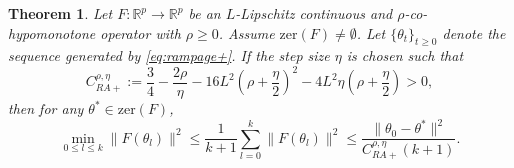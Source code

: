 \documentclass[10pt,a4paper]{amsart}
\newtheorem{theorem}{Theorem}
\begin{document}
\begin{theorem} \label{thm:es_ramp_general}
Let $F: \mathbb{R}^p \to \mathbb{R}^p$ be an $L$-Lipschitz continuous and $\rho$-co-hypomonotone operator with $\rho \ge 0$. Assume $\mathrm{zer}(F) \neq \emptyset$. Let $\{\theta_t\}_{t \ge 0}$ denote the sequence generated by \eqref{eq:rampage+}. If the step size $\eta$ is chosen such that
\begin{equation}
C_{RA+}^{\rho,\eta} := \frac{3}{4} - \frac{2\rho}{\eta} - 16L^2 \left(\rho + \frac{\eta}{2}\right)^2 - 4L^2\eta \left(\rho + \frac{\eta}{2}\right) > 0,
\end{equation}
then for any $\theta^* \in \mathrm{zer}(F)$,
\begin{equation}
\min_{0 \le l \le k} \|F(\theta_l)\|^2 \le \frac{1}{k+1} \sum_{l=0}^k \|F(\theta_l)\|^2 \le \frac{\|\theta_0 - \theta^*\|^2}{C_{RA+}^{\rho,\eta} (k+1)}.
\end{equation}
\end{theorem}
\end{document}
